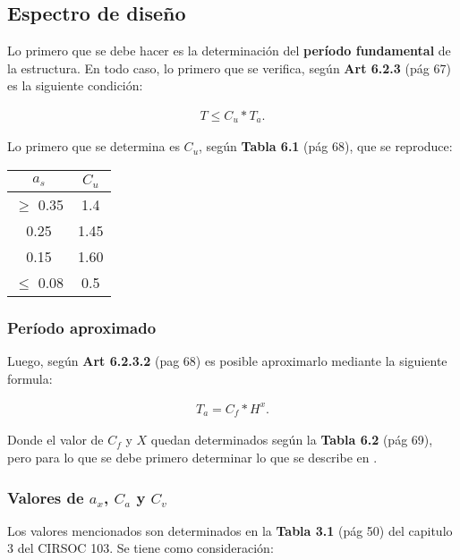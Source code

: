 \documentclass[../main.tex]{subfiles}
\begin{document}
\subsection{Espectro de diseño}

Lo primero que se debe hacer es la determinación del \textbf{período fundamental}
de la estructura. En todo caso, lo primero que se verifica, según \textbf{Art 6.2.3}
(pág 67) es la siguiente condición:

\begin{align*}
  T \leq C_u * T_a
.\end{align*}

Lo primero que se determina es $C_u$, según  \textbf{Tabla 6.1} (pág 68), que se
reproduce:

\begin{center}
  \begin{tabular}{|c|c|}
    \hline
    $a_s$ & $C_u$ \\
    \hline
    $\geq $ 0.35 & 1.4 \\
    \hline
    0.25 & 1.45 \\
    \hline
    0.15 & 1.60 \\
    \hline
    $\leq $ 0.08  & 0.5 \\
    \hline
 \end{tabular} 
\end{center}

\subsubsection{Período aproximado}


Luego, según \textbf{Art 6.2.3.2} (pag 68) es posible aproximarlo mediante
la siguiente formula:

\begin{align*}
  T_a = C_f * H^x
.\end{align*}

Donde el valor de $C_f$ y $X$ quedan determinados según la \textbf{Tabla 6.2}
(pág 69), pero para lo que se debe primero determinar lo que se describe en
.

\subsubsection{Valores de $a_x$,  $C_a$ y  $C_v$}\label{ax}

Los valores mencionados son determinados en la \textbf{Tabla 3.1} (pág 50) del
capitulo 3 del CIRSOC 103. Se tiene como consideración:
\end{document}
